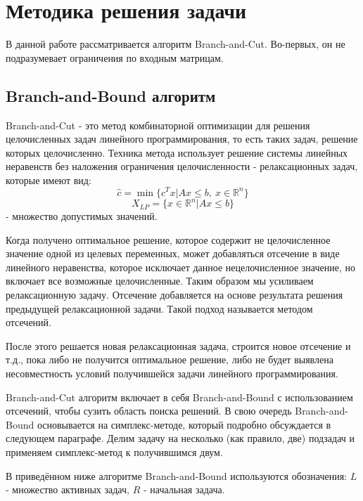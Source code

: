 \documentclass[a4paper,14pt,russian]{extreport}
\begin{document}
\chapter{Методика решения задачи}

В данной работе рассматривается алгоритм Branch-and-Cut. Во-первых, он не подразумевает ограничения по входным матрицам. 

\section{Branch-and-Bound алгоритм}

Branch-and-Cut - это метод комбинаторной оптимизации для решения целочисленных задач линейного программирования, то есть таких задач, решение которых целочисленно. Техника метода использует решение системы линейных неравенств без наложения ограничения целочисленности - релаксационных задач, которые имеют вид: 
$$\hat c = \min \{c^Tx|Ax\le b,~ x\in\mathbb{R}^n\}$$
$$X_{LP} = \{x \in \mathbb{R}^n | Ax \le b\}$$ - множество допустимых значений. 
\par
Когда получено оптимальное решение, которое содержит не целочисленное значение одной из целевых переменных, может добавляться отсечение в виде линейного неравенства, которое исключает данное нецелочисленное значение, но включает все возможные целочисленные. Таким образом мы усиливаем релаксационную задачу. Отсечение добавляется на основе результата решения предыдущей релаксационной задачи. Такой подход называется методом отсечений. 
\par
После этого решается новая релаксационная задача, строится новое отсечение и т.д., пока либо не получится оптимальное решение, либо не будет выявлена несовместность условий получившейся задачи линейного программирования. 
\par
Branch-and-Cut алгоритм включает в себя Branch-and-Bound с использованием отсечений, чтобы сузить область поиска решений. В свою очередь Branch-and-Bound основывается на симплекс-методе, который подробно обсуждается в следующем параграфе. Делим задачу на несколько (как правило, две) подзадач и применяем симплекс-метод к получившимся двум.
\par
В приведённом ниже алгоритме Branch-and-Bound используются обозначения: $L$ - множество активных задач, $R$ - начальная задача. 
\end{document}
